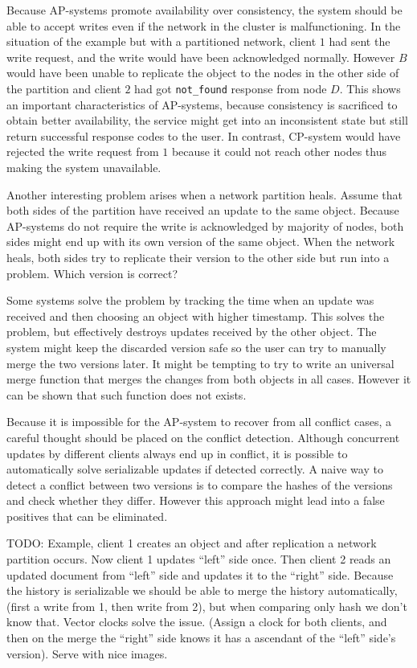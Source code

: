 Because AP-systems promote availability over consistency, the system should be
able to accept writes even if the network in the cluster is malfunctioning. In
the situation of the example but with a partitioned network, client \(1\) had
sent the write request, and the write would have been acknowledged normally.
However \(B\) would have been unable to replicate the object to the nodes in the
other side of the partition and client \(2\) had got \texttt{not\_found}
response from node \(D\). This shows an important characteristics of AP-systems,
because consistency is sacrificed to obtain better availability, the service
might get into an inconsistent state but still return successful response codes
to the user. In contrast, CP-system would have rejected the write request from
\(1\) because it could not reach other nodes thus making the system unavailable.

Another interesting problem arises when a network partition heals. Assume that
both sides of the partition have received an update to the same object. Because
AP-systems do not require the write is acknowledged by majority of nodes, both
sides might end up with its own version of the same object. When the network
heals, both sides try to replicate their version to the other side but run into
a problem. Which version is correct?

Some systems solve the problem by tracking the time when an update was received
and then choosing an object with higher timestamp. This solves the problem, but
effectively destroys updates received by the other object. The system might keep
the discarded version safe so the user can try to manually merge the two
versions later. It might be tempting to try to write an universal merge function
that merges the changes from both objects in all cases. However it can be shown
that such function does not exists.

Because it is impossible for the AP-system to recover from all conflict cases, a
careful thought should be placed on the conflict detection. Although concurrent
updates by different clients always end up in conflict, it is possible to
automatically solve serializable updates if detected correctly. A naive way to
detect a conflict between two versions is to compare the hashes of the versions
and check whether they differ. However this approach might lead into a false
positives that can be eliminated.

TODO: Example, client 1 creates an object and after replication a network
partition occurs. Now client 1 updates ``left'' side once. Then client 2 reads
an updated document from ``left'' side and updates it to the ``right'' side.
Because the history is serializable we should be able to merge the history
automatically, (first a write from 1, then write from 2), but when comparing
only hash we don't know that. Vector clocks solve the issue. (Assign a clock for
both clients, and then on the merge the ``right'' side knows it has a ascendant
of the ``left'' side's version). Serve with nice images.
